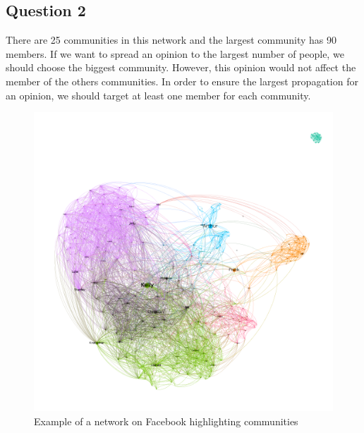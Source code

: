 \documentclass[a4paper]{article}
\begin{document}
\subsection{Question 2}

There are 25 communities in this network and the largest community has 90 members. If we want to spread an opinion to the largest number of people, we should choose the biggest community. However, this opinion would not affect the member of the others communities. In order to ensure the largest propagation for an opinion, we should target at least one member for each community.

\begin{figure}[!htpb]
\centering
\includegraphics[width=\textwidth]{res/img/facebook}
\caption{Example of a network on Facebook highlighting communities}
\label{fig:facebook}
\end{figure}
\end{document}
